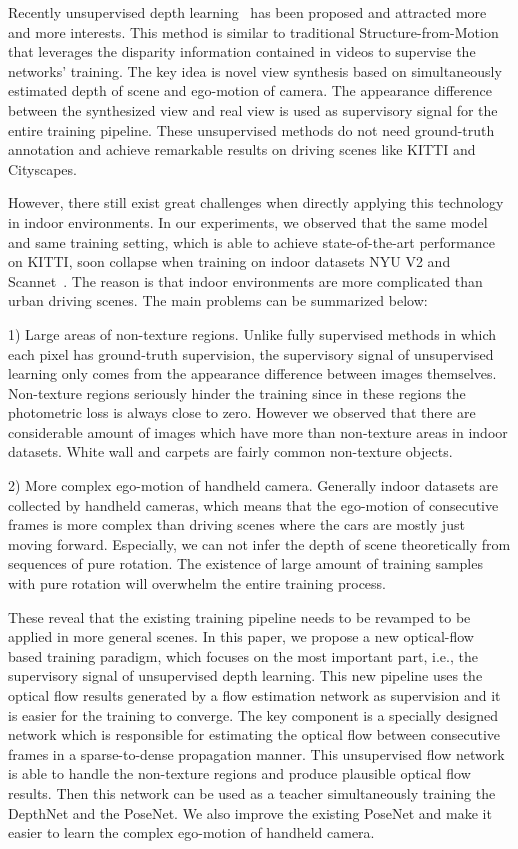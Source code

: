 \documentclass[10pt,twocolumn,letterpaper]{article}
\begin{document}
Recently unsupervised depth learning~\cite{zhou2017unsupervised,godard2017unsupervised,yin2018geonet} has been proposed and attracted more and more interests. This method is similar to traditional Structure-from-Motion that leverages the disparity information contained in videos to supervise the networks' training. The key idea is novel view synthesis based on simultaneously estimated depth of scene and ego-motion of camera. The appearance difference between the synthesized view and real view is used as supervisory signal for the entire training pipeline. These unsupervised methods do not need ground-truth annotation and achieve remarkable results on driving scenes like KITTI and Cityscapes. 

However, there still exist great challenges when directly applying this technology in indoor environments. In our experiments, we observed that the same model and same training setting, which is able to achieve state-of-the-art performance on KITTI, soon collapse when training on indoor datasets NYU V2\cite{silberman2012indoor} and Scannet~\cite{dai2017scannet}. The reason is that indoor environments are more complicated than urban driving scenes. The main problems can be summarized below:

1) Large areas of non-texture regions. Unlike fully supervised methods in which each pixel has ground-truth supervision, the supervisory signal of unsupervised learning only comes from the appearance difference between images themselves. Non-texture regions seriously hinder the training since in these regions the photometric loss is always close to zero. However we observed that there are considerable amount of images which have more than  non-texture areas in indoor datasets. White wall and carpets are fairly common non-texture objects.

2) More complex ego-motion of handheld camera. Generally indoor datasets are collected by handheld cameras, which means that the ego-motion of consecutive frames is more complex than driving scenes where the cars are mostly just moving forward. Especially, we can not infer the depth of scene theoretically from sequences of pure rotation. The existence of large amount of training samples with pure rotation will overwhelm the entire training process. 

These reveal that the existing training pipeline needs to be revamped to be applied in more general scenes. In this paper, we propose a new optical-flow based training paradigm, which focuses on the most important part, i.e., the supervisory signal of unsupervised depth learning. This new pipeline uses the optical flow results generated by a flow estimation network as supervision and it is easier for the training to converge. The key component is a specially designed network which is responsible for estimating the optical flow between consecutive frames in a sparse-to-dense propagation manner. This unsupervised flow network is able to handle the non-texture regions and produce plausible optical flow results. Then this network can be used as a teacher simultaneously training the DepthNet and the PoseNet. We also improve the existing PoseNet and make it easier to learn the complex ego-motion of handheld camera.
\end{document}
